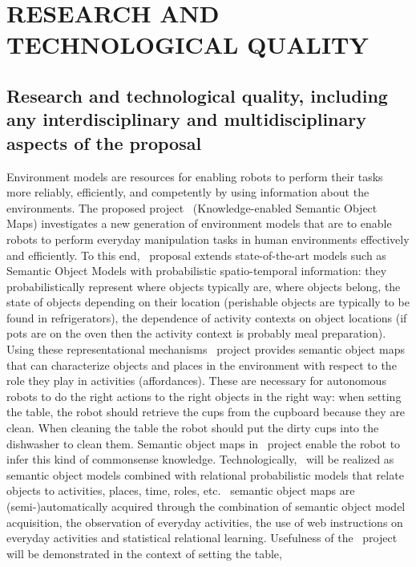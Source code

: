\section{RESEARCH AND TECHNOLOGICAL QUALITY} %
\label{sec:quality}
\subsection{Research and technological quality, including any interdisciplinary and multidisciplinary 
aspects of the proposal}
\label{sec:q1}
Environment models are resources  for enabling robots to perform their
tasks more reliably, efficiently, and competently by using information
about the  environments. The proposed  project \ksem\ (Knowledge-enabled
Semantic Object Maps) investigates a new generation of environment models that
are to enable  robots to perform everyday manipulation  tasks in human
environments effectively and efficiently.   To this end, \ksem\ proposal
extends state-of-the-art  models such  as Semantic Object  Models with
probabilistic  spatio-temporal   information:  they  probabilistically
represent where objects typically are, where objects belong, the state
of  objects  depending  on  their  location  (perishable  objects  are
typically to  be found in  refrigerators), the dependence  of activity
contexts  on  object locations  (if  pots are  on  the  oven then  the
activity   context  is   probably  meal   preparation).   Using  these
representational mechanisms \ksem\ project provides semantic object maps that can
characterize objects and places in the environment with respect to the
role they  play in activities  (affordances). These are  necessary for
autonomous robots to do the right  actions to the right objects in the
right way: when setting the  table, the robot should retrieve the cups
from the cupboard because they  are clean. When cleaning the table the
robot  should  put  the  dirty  cups  into  the  dishwasher  to  clean
them.  Semantic object maps in \ksem\ project  enable the  robot  to  infer  this kind  of  commonsense
knowledge.   Technologically,  \ksem \ will  be realized as  semantic object  models
combined with  relational probabilistic models that  relate objects to
activities, places,  time, roles, etc.  \ksem\ semantic object maps are (semi-)automatically
acquired through the combination of semantic object model acquisition,
the observation of everyday activities, the use of web instructions on
everyday activities and statistical relational learning. Usefulness of 
the \ksem\ project will be demonstrated  in the context of  setting  the  table, 
